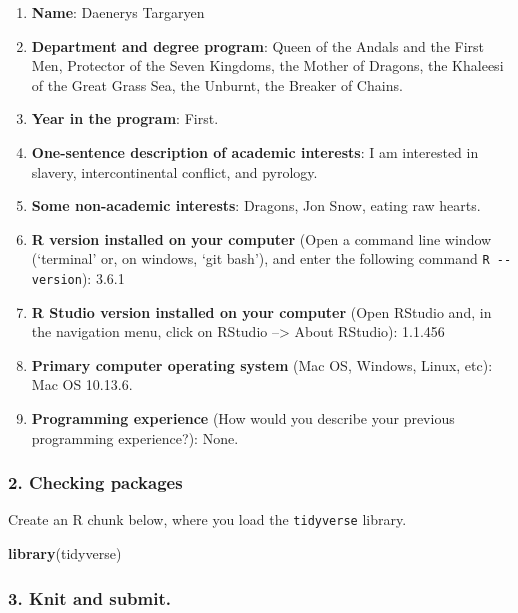 \documentclass[]{book}
\newenvironment{Shaded}{\begin{snugshade}}{\end{snugshade}}
\newcommand{\KeywordTok}[1]{\textcolor[rgb]{0.13,0.29,0.53}{\textbf{#1}}}
\newcommand{\NormalTok}[1]{#1}
\providecommand{\tightlist}{%
  \setlength{\itemsep}{0pt}\setlength{\parskip}{0pt}}
\begin{document}
\begin{enumerate}
\def\labelenumi{\arabic{enumi}.}
\tightlist
\item
  \textbf{Name}: Daenerys Targaryen
\item
  \textbf{Department and degree program}: Queen of the Andals and the
  First Men, Protector of the Seven Kingdoms, the Mother of Dragons, the
  Khaleesi of the Great Grass Sea, the Unburnt, the Breaker of Chains.
\item
  \textbf{Year in the program}: First.
\item
  \textbf{One-sentence description of academic interests}: I am
  interested in slavery, intercontinental conflict, and pyrology.
\item
  \textbf{Some non-academic interests}: Dragons, Jon Snow, eating raw
  hearts.
\item
  \textbf{R version installed on your computer} (Open a command line
  window (`terminal' or, on windows, `git bash'), and enter the
  following command \texttt{R\ -\/-version}): 3.6.1
\item
  \textbf{R Studio version installed on your computer} (Open RStudio
  and, in the navigation menu, click on RStudio --\textgreater{} About
  RStudio): 1.1.456
\item
  \textbf{Primary computer operating system} (Mac OS, Windows, Linux,
  etc): Mac OS 10.13.6.
\item
  \textbf{Programming experience} (How would you describe your previous
  programming experience?): None.
\end{enumerate}

\subsubsection*{2. Checking packages}\label{checking-packages}

Create an R chunk below, where you load the \texttt{tidyverse} library.

\begin{Shaded}
\begin{Highlighting}[]
\KeywordTok{library}\NormalTok{(tidyverse)}
\end{Highlighting}
\end{Shaded}

\subsubsection*{3. Knit and submit.}\label{knit-and-submit.}
\end{document}

